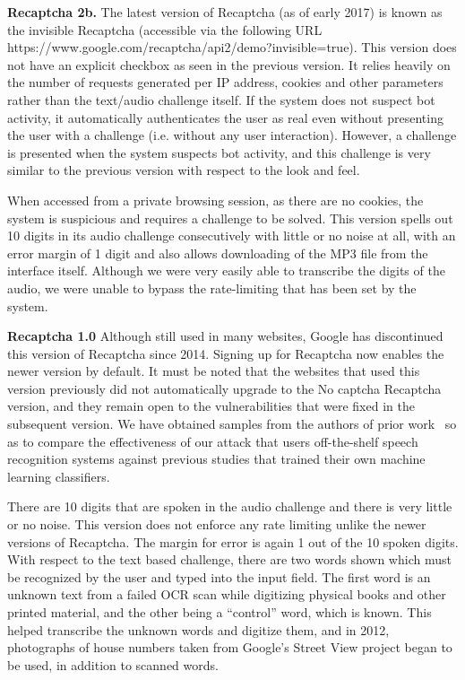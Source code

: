 \textbf{Recaptcha 2b.} The latest version of Recaptcha (as of early 2017) is known as the invisible Recaptcha 
(accessible via the following URL https://www.google.com/recaptcha/api2/\newline demo?invisible=true). This 
version does not have an explicit checkbox as seen in the previous version. It relies heavily on the number 
of requests generated per IP address, cookies and other parameters rather than the text/audio challenge itself. 
If the system does not suspect bot activity, it automatically authenticates the user as real even without presenting 
the user with a challenge (i.e. without any user interaction). However, a challenge is presented when the system 
suspects bot activity, and this challenge is very similar to the previous version with respect to the look and feel.

When accessed from a private browsing session, as there are no cookies, the system is suspicious and requires a challenge 
to be solved. This version spells out 10 digits in its audio challenge consecutively with little or no noise at all, with 
an error margin of 1 digit and also allows downloading of the MP3 file from the interface itself. Although we were very 
easily able to transcribe the digits of the audio, we were unable to bypass the rate-limiting that has been set by the system.

\textbf{Recaptcha 1.0} Although still used in many websites, Google has discontinued this version of Recaptcha since 2014. 
Signing up for Recaptcha now enables the newer version by default. It must be
noted that the websites that used this version previously did not automatically upgrade to the No 
captcha Recaptcha version, and they remain open to the vulnerabilities that were fixed in the subsequent 
version. We have obtained  samples from the authors of prior work~\cite{meutzner2014using} so as to 
compare the effectiveness of our attack that users off-the-shelf speech recognition systems against previous 
studies that trained their own machine learning classifiers.

There are 10 digits that are spoken in the audio challenge and there is very little or no noise. This 
version does not enforce any rate limiting unlike the newer versions of Recaptcha. The margin for error 
is again 1 out of the 10 spoken digits. With respect to the text based challenge, there are two words 
shown which must be recognized by the user and typed into the input field. The first word is an unknown 
text from a failed OCR scan while digitizing physical books and other printed material, and the other 
being a ``control'' word, which is known. This helped transcribe the unknown words and digitize them, and 
in 2012, photographs of house numbers taken from Google's Street View project began to be used, in 
addition to scanned words. 

